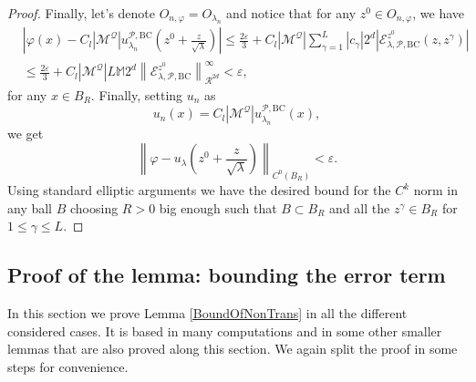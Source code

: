 \documentclass{amsart}
\theoremstyle{definition}
\theoremstyle{remark}
\newcommand{\ep}{\varepsilon}
\newcommand{\vp}{\varphi}
\renewcommand\leq\leqslant
\numberwithin{equation}{section}
\theoremstyle{definition}
\theoremstyle{remark}
\begin{document}
\begin{proof}
    Finally, let's denote $O_{n,\varphi}=O_{\lambda_n}$ and notice that for any $z^0\in O_{n,\varphi} $, we have  \begin{equation}\label{error}
		\begin{aligned}
			&	\left|	\vp(x)-	C_l|\mathcal{M}^\mathcal{Q}|u_{\lambda_n}^{\mathcal{P},\mathrm{BC}}\left(z^0+\frac{z}{\sqrt{\lambda}}\right)\right|\leq\frac{2\ep}{3}+	C_l|\mathcal{M}^\mathcal{Q}|\sum_{\gamma=1}^{L}|c_\gamma|2^d\left|\mathcal{E}_{\lambda,\mathcal{P},\mathrm{BC}}^{z^0}(z,z^\gamma)\right|\\
			&\leq\frac{2\ep}{3}+	C_l|\mathcal{M}^\mathcal{Q}|L\mathbb{M}2^d\left\|\mathcal{E}_{\lambda,\mathcal{P},\mathrm{BC}}^{z^0}\right\|_{\mathcal{R}^{2d}}^{\infty}<\ep,
		\end{aligned}
	\end{equation}for any $x\in B_R$.
	Finally, setting $u_n$ as \begin{equation}
		u_n(x)=C_l|\mathcal{M}^\mathcal{Q}|u_{\lambda_n}^{\mathcal{P},\mathrm{BC}}(x),
	\end{equation}we get \begin{equation}
		\left\|\vp-u_\lambda\left(z^0+\frac{z}{\sqrt{\lambda}}\right)\right\|_{C^0(B_R)}<\ep.
	\end{equation} Using standard elliptic arguments we have the desired bound for the $C^k$ norm in any ball $B$ choosing $R>0$ big enough such that $B\subset B_R$ and all the $z^\gamma\in B_R$ for $1\leq\gamma\leq L$.  
\end{proof}


\subsection{Proof of the lemma: bounding the error term}\label{lemmas}
In this section we prove Lemma \ref{BoundOfNonTrans} in all the different considered cases. It is based in many computations and in some other smaller lemmas that are also proved along this section. We again split the proof in some steps for convenience.
\end{document}
